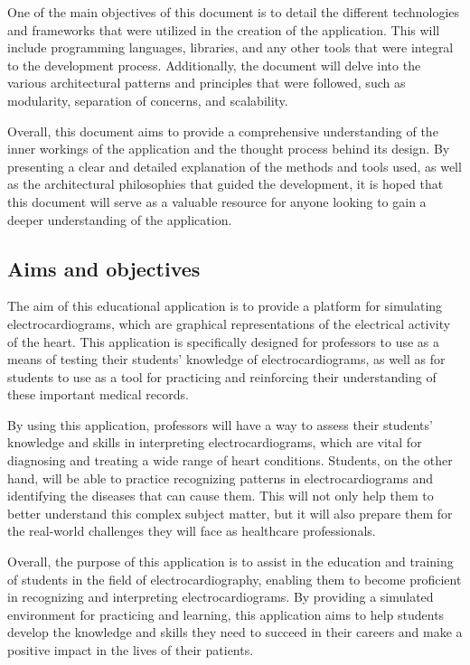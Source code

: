 \documentclass[singlespacing,12pt,parskip,headsepline,consistentlayout]{article}
\begin{document}
One of the main objectives of this document is to detail the different technologies and frameworks that were utilized in the creation of the application. This will include programming languages, libraries, and any other tools that were integral to the development process. Additionally, the document will delve into the various architectural patterns and principles that were followed, such as modularity, separation of concerns, and scalability.

Overall, this document aims to provide a comprehensive understanding of the inner workings of the application and the thought process behind its design. By presenting a clear and detailed explanation of the methods and tools used, as well as the architectural philosophies that guided the development, it is hoped that this document will serve as a valuable resource for anyone looking to gain a deeper understanding of the application.


\subsection{Aims and objectives}

The aim of this educational application is to provide a platform for simulating electrocardiograms, which are graphical representations of the electrical activity of the heart. This application is specifically designed for professors to use as a means of testing their students' knowledge of electrocardiograms, as well as for students to use as a tool for practicing and reinforcing their understanding of these important medical records.

By using this application, professors will have a way to assess their students' knowledge and skills in interpreting electrocardiograms, which are vital for diagnosing and treating a wide range of heart conditions. Students, on the other hand, will be able to practice recognizing patterns in electrocardiograms and identifying the diseases that can cause them. This will not only help them to better understand this complex subject matter, but it will also prepare them for the real-world challenges they will face as healthcare professionals.

Overall, the purpose of this application is to assist in the education and training of students in the field of electrocardiography, enabling them to become proficient in recognizing and interpreting electrocardiograms. By providing a simulated environment for practicing and learning, this application aims to help students develop the knowledge and skills they need to succeed in their careers and make a positive impact in the lives of their patients.
\end{document}
